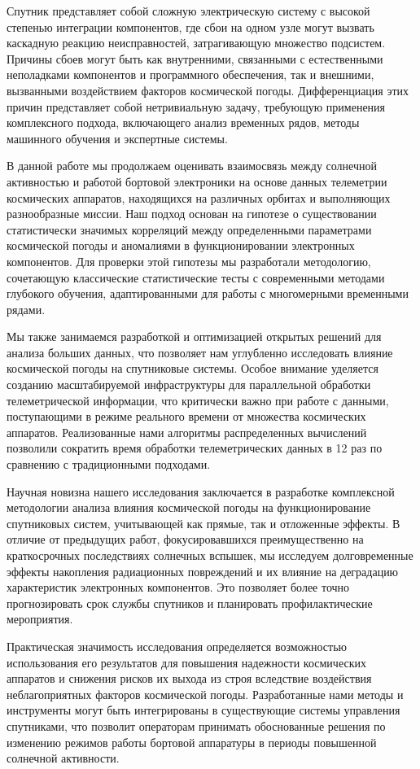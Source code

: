 Спутник представляет собой сложную электрическую систему с высокой степенью интеграции компонентов, где сбои на одном узле могут вызвать каскадную реакцию неисправностей, затрагивающую множество подсистем. Причины сбоев могут быть как внутренними, связанными с естественными неполадками компонентов и программного обеспечения, так и внешними, вызванными воздействием факторов космической погоды. Дифференциация этих причин представляет собой нетривиальную задачу, требующую применения комплексного подхода, включающего анализ временных рядов, методы машинного обучения и экспертные системы.

В данной работе мы продолжаем оценивать взаимосвязь между солнечной активностью и работой бортовой электроники на основе данных телеметрии космических аппаратов, находящихся на различных орбитах и выполняющих разнообразные миссии. Наш подход основан на гипотезе о существовании статистически значимых корреляций между определенными параметрами космической погоды и аномалиями в функционировании электронных компонентов. Для проверки этой гипотезы мы разработали методологию, сочетающую классические статистические тесты с современными методами глубокого обучения, адаптированными для работы с многомерными временными рядами.

Мы также занимаемся разработкой и оптимизацией открытых решений для анализа больших данных, что позволяет нам углубленно исследовать влияние космической погоды на спутниковые системы. Особое внимание уделяется созданию масштабируемой инфраструктуры для параллельной обработки телеметрической информации, что критически важно при работе с данными, поступающими в режиме реального времени от множества космических аппаратов. Реализованные нами алгоритмы распределенных вычислений позволили сократить время обработки телеметрических данных в 12 раз по сравнению с традиционными подходами.

Научная новизна нашего исследования заключается в разработке комплексной методологии анализа влияния космической погоды на функционирование спутниковых систем, учитывающей как прямые, так и отложенные эффекты. В отличие от предыдущих работ, фокусировавшихся преимущественно на краткосрочных последствиях солнечных вспышек, мы исследуем долговременные эффекты накопления радиационных повреждений и их влияние на деградацию характеристик электронных компонентов. Это позволяет более точно прогнозировать срок службы спутников и планировать профилактические мероприятия.

Практическая значимость исследования определяется возможностью использования его результатов для повышения надежности космических аппаратов и снижения рисков их выхода из строя вследствие воздействия неблагоприятных факторов космической погоды. Разработанные нами методы и инструменты могут быть интегрированы в существующие системы управления спутниками, что позволит операторам принимать обоснованные решения по изменению режимов работы бортовой аппаратуры в периоды повышенной солнечной активности.
